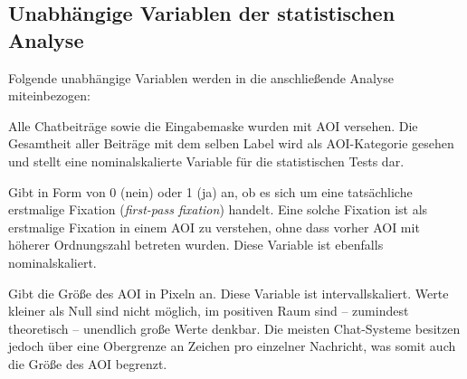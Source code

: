 
\subsection{Unabhängige Variablen der statistischen Analyse}
\label{K5:subsubsec:UnabhaengigeVariablenStudie}


Folgende unabhängige Variablen werden in die anschließende Analyse miteinbezogen:

\begin{description}[font=\normalfont]
    \item [AOI-Kategorie:] Alle Chatbeiträge sowie die Eingabemaske wurden mit AOI versehen. Die Gesamtheit aller Beiträge mit dem selben Label wird als AOI-Kategorie gesehen und stellt eine nominalskalierte Variable für die statistischen Tests dar.
    
	\item [Progressive erste Fixation (IAFFixPro):] Gibt in Form von 0 (nein) oder 1 (ja) an, ob es sich um eine tatsächliche erstmalige Fixation (\emph{first-pass fixation}) handelt. Eine solche Fixation ist als erstmalige Fixation in einem AOI zu verstehen, ohne dass vorher AOI mit höherer Ordnungszahl betreten wurden. Diese Variable ist ebenfalls nominalskaliert.
	
	\item [Größe des AOI (IASize):] Gibt die Größe des AOI in Pixeln an. Diese Variable ist intervallskaliert. Werte kleiner als Null sind nicht möglich, im positiven Raum sind -- zumindest theoretisch -- unendlich große Werte denkbar. Die meisten Chat-Systeme besitzen jedoch über eine Obergrenze an Zeichen pro einzelner Nachricht, was somit auch die Größe des AOI begrenzt.
\end{description}
